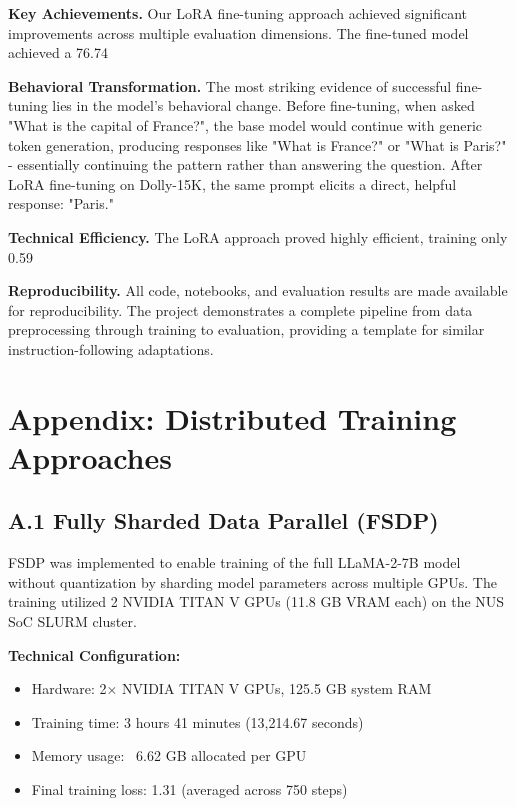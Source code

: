 \documentclass{assignment7_report}
\begin{document}
\textbf{Key Achievements.} Our LoRA fine-tuning approach achieved significant improvements across multiple evaluation dimensions. The fine-tuned model achieved a 76.74%

\textbf{Behavioral Transformation.} The most striking evidence of successful fine-tuning lies in the model's behavioral change. Before fine-tuning, when asked "What is the capital of France?", the base model would continue with generic token generation, producing responses like "What is France?" or "What is Paris?" - essentially continuing the pattern rather than answering the question. After LoRA fine-tuning on Dolly-15K, the same prompt elicits a direct, helpful response: "Paris."

\textbf{Technical Efficiency.} The LoRA approach proved highly efficient, training only 0.59%

\textbf{Reproducibility.} All code, notebooks, and evaluation results are made available for reproducibility. The project demonstrates a complete pipeline from data preprocessing through training to evaluation, providing a template for similar instruction-following adaptations.

\section*{Appendix: Distributed Training Approaches}

\subsection*{A.1 Fully Sharded Data Parallel (FSDP)}

FSDP was implemented to enable training of the full LLaMA-2-7B model without quantization by sharding model parameters across multiple GPUs. The training utilized 2 NVIDIA TITAN V GPUs (11.8 GB VRAM each) on the NUS SoC SLURM cluster.

\textbf{Technical Configuration:}
\begin{itemize}
    \item Hardware: 2× NVIDIA TITAN V GPUs, 125.5 GB system RAM
    \item Training time: 3 hours 41 minutes (13,214.67 seconds)
    \item Memory usage: ~6.62 GB allocated per GPU
    \item Final training loss: 1.31 (averaged across 750 steps)
\end{itemize}
\end{document}
